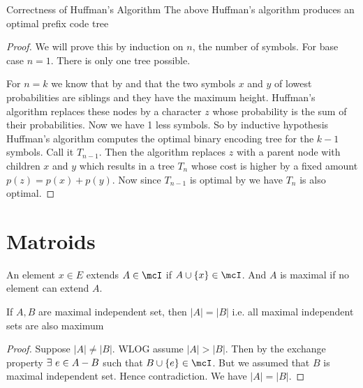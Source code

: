 \begin{Theorem}{Correctness of Huffman's Algorithm}{}
	The above Huffman's algorithm produces an optimal prefix code tree
\end{Theorem}
\begin{proof}
	We will prove this by induction on $n$, the number of symbols. For base case $n=1$. There is only one tree possible.
	
	For $n=k$ we know that by  and  that the two symbols $x$ and $y$ of lowest probabilities are siblings and they have the maximum height. Huffman's algorithm replaces these nodes by a character $z$ whose probability is the sum of their probabilities. Now we have 1 less symbols. So by inductive hypothesis Huffman's algorithm computes the optimal binary encoding tree for the $k-1$ symbols. Call it $T_{n-1}$. Then the algorithm replaces $z$ with a parent node with children $x$ and $y$ which results in a tree $T_n$ whose cost is higher by a fixed amount $p(z)=p(x)+p(y)$. Now since $T_{n-1}$ is optimal by  we have $T_n$ is also optimal.
\end{proof}
\section{Matroids}
An element $x\in E$ extends $A\in\mcI$ if $A\cup \{x\}\in\mcI$. And $A$ is maximal if no element can extend $A$.
\begin{lemma}{}{}
	If $A,B$ are maximal independent set, then $|A|=|B|$ i.e. all maximal independent sets are also maximum
\end{lemma}
\begin{proof}
	Suppose $|A|\neq |B|$. WLOG assume $|A|>|B|$. Then by the exchange property $\exists\ e\in A-B$ such that $B\cup \{e\}\in\mcI$. But we assumed that $B$ is maximal independent set. Hence contradiction. We have $|A|=|B|$.
\end{proof}
\parinf

